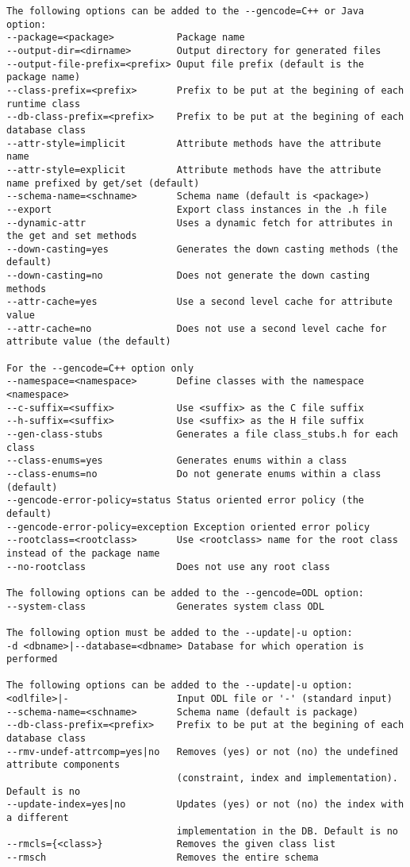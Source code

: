 \begin{verbatim}
The following options can be added to the --gencode=C++ or Java option:
--package=<package>           Package name
--output-dir=<dirname>        Output directory for generated files
--output-file-prefix=<prefix> Ouput file prefix (default is the package name)
--class-prefix=<prefix>       Prefix to be put at the begining of each runtime class
--db-class-prefix=<prefix>    Prefix to be put at the begining of each database class
--attr-style=implicit         Attribute methods have the attribute name
--attr-style=explicit         Attribute methods have the attribute name prefixed by get/set (default)
--schema-name=<schname>       Schema name (default is <package>)
--export                      Export class instances in the .h file
--dynamic-attr                Uses a dynamic fetch for attributes in the get and set methods
--down-casting=yes            Generates the down casting methods (the default)
--down-casting=no             Does not generate the down casting methods
--attr-cache=yes              Use a second level cache for attribute value
--attr-cache=no               Does not use a second level cache for attribute value (the default)

For the --gencode=C++ option only
--namespace=<namespace>       Define classes with the namespace <namespace>
--c-suffix=<suffix>           Use <suffix> as the C file suffix
--h-suffix=<suffix>           Use <suffix> as the H file suffix
--gen-class-stubs             Generates a file class_stubs.h for each class
--class-enums=yes             Generates enums within a class
--class-enums=no              Do not generate enums within a class (default)
--gencode-error-policy=status Status oriented error policy (the default)
--gencode-error-policy=exception Exception oriented error policy
--rootclass=<rootclass>       Use <rootclass> name for the root class instead of the package name
--no-rootclass                Does not use any root class

The following options can be added to the --gencode=ODL option:
--system-class                Generates system class ODL

The following option must be added to the --update|-u option:
-d <dbname>|--database=<dbname> Database for which operation is performed

The following options can be added to the --update|-u option:
<odlfile>|-                   Input ODL file or '-' (standard input)
--schema-name=<schname>       Schema name (default is package)
--db-class-prefix=<prefix>    Prefix to be put at the begining of each database class
--rmv-undef-attrcomp=yes|no   Removes (yes) or not (no) the undefined attribute components
                              (constraint, index and implementation). Default is no
--update-index=yes|no         Updates (yes) or not (no) the index with a different
                              implementation in the DB. Default is no
--rmcls={<class>}             Removes the given class list
--rmsch                       Removes the entire schema


\end{verbatim}
